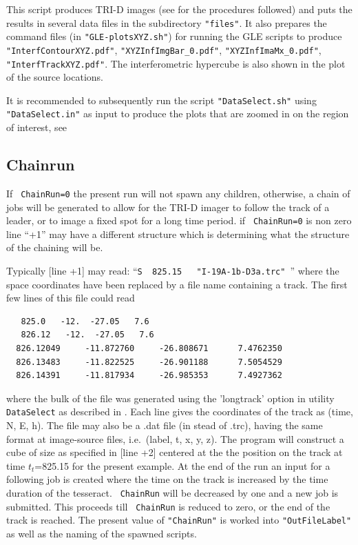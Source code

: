 This script produces TRI-D images (see  for the procedures followed)
and puts the results in several data files in the subdirectory \verb!"files"!. It also prepares the command files (in \verb!"GLE-plotsXYZ.sh"!) for running the GLE scripts \cite{GLE} to produce \verb!"InterfContourXYZ.pdf"!, \verb!"XYZInfImgBar_0.pdf"!, \verb!"XYZInfImaMx_0.pdf"!, \verb!"InterfTrackXYZ.pdf"!. The interferometric hypercube is also shown in the plot of the source locations.

It is recommended to subsequently run the script \verb!"DataSelect.sh"! using \verb!"DataSelect.in"! as input to produce the plots that are zoomed in on the region of interest, see 

\subsection{Chainrun} 

If \verb# ChainRun=0# the present run will not spawn any children, otherwise, a chain of jobs will be generated to allow for the TRI-D imager to follow the track of a leader, or to image a fixed spot for a long time period.
if \verb# ChainRun=0# is non zero line ``+1'' may have a different structure which is determining what the structure of the chaining will be.

Typically [line +1] may read:  ``\verb#S  825.15   "I-19A-1b-D3a.trc" #'' where the space coordinates have been replaced by a file name containing a track. The first few lines of this file could read
{\tiny
\begin{verbatim}
   825.0   -12.  -27.05   7.6
   826.12   -12.  -27.05   7.6
  826.12049     -11.872760     -26.808671      7.4762350
  826.13483     -11.822525     -26.901188      7.5054529
  826.14391     -11.817934     -26.985353      7.4927362
\end{verbatim}
}
where the bulk of the file was generated using the 'longtrack' option in utility \verb!DataSelect! as described in . Each line gives the coordinates of the track as (time, N, E, h). The file may also be a .dat file (in stead of .trc),  having the same format at image-source files, i.e.\ (label, t, x, y, z). The program will construct a cube of size as specified in [line +2] centered at the the position on the track at time $t_t$=825.15 for the present example. At the end of the run an input for a following job is created where the time on the track is increased by the time duration of the tesseract. \verb# ChainRun# will be decreased by one and a new job is submitted. This proceeds till \verb# ChainRun# is reduced to zero, or the end of the track is reached. The present value of \verb!"ChainRun"! is worked into \verb!"OutFileLabel"! as well as the naming of the spawned scripts.


